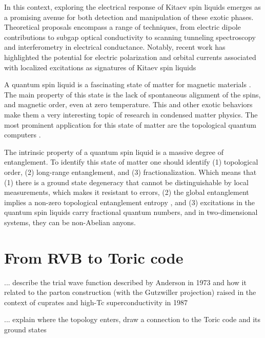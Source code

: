 In this context, exploring the electrical response of Kitaev spin liquids emerges as a promising avenue for both detection and manipulation of these exotic phases. Theoretical proposals encompass a range of techniques, from electric dipole contributions to subgap optical conductivity to scanning tunneling spectroscopy and interferometry in electrical conductance. Notably, recent work has highlighted the potential for electric polarization and orbital currents associated with localized excitations as signatures of Kitaev spin liquids %



A quantum spin liquid is a fascinating state of matter for magnetic materials \cite{Savary2016}.
The main property of this state is the lack of spontaneous alignment of the spins, and magnetic order, even at zero temperature. This and other exotic behaviors make them a very interesting topic of research in condensed matter physics.
The most prominent application for this state of matter are the topological quantum computers \cite{Kitaev2003,Nayak2008}.

The intrinsic property of a quantum spin liquid is a massive degree of entanglement.
To identify this state of matter one should identify (1) topological order, (2) long-range entanglement, and (3) fractionalization. Which means that
(1) there is a ground state degeneracy that cannot be distinguishable by local measurements, which makes it resistant to errors,
(2) the global entanglement implies a non-zero topological entanglement entropy \cite{Kitaev_2006,Jiang_2012},
and (3) excitations in the quantum spin liquids carry fractional quantum numbers, and in two-dimensional systems, they can be non-Abelian anyons.



\section{From RVB to Toric code}

... describe the trial wave function described by Anderson in 1973 and how it related to the parton construction (with the Gutzwiller projection)  raised in the context of cuprates and high-Tc superconductivity in 1987

... explain where the topology enters, draw a connection to the Toric code and its ground states


